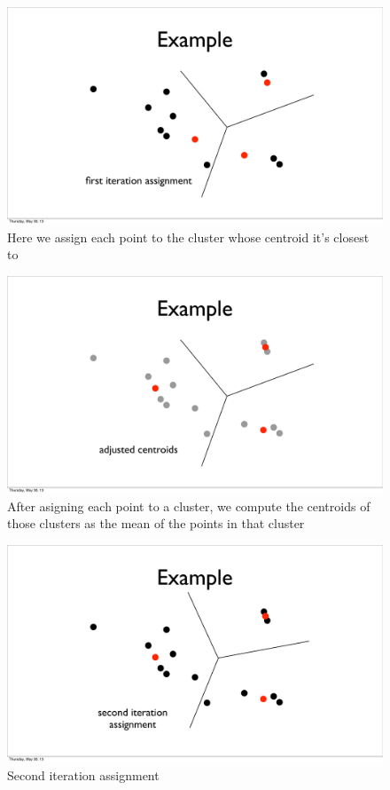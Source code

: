 \documentclass{article}
\begin{document}
\begin{figure}[H]
    \caption{Here we assign each point to the cluster whose centroid it's
    closest to}
    \includegraphics[scale=0.4]{kmeans-points-assign1.pdf}
\end{figure}

\begin{figure}[H]
    \caption{After asigning each point to a cluster, we compute the centroids
    of those clusters as the mean of the points in that cluster}
    \includegraphics[scale=0.4]{kmeans-points-adjust1.pdf}
\end{figure}

\begin{figure}[H]
    \caption{Second iteration assignment}
    \includegraphics[scale=0.4]{kmeans-points-assign2.pdf}
\end{figure}
\end{document}

